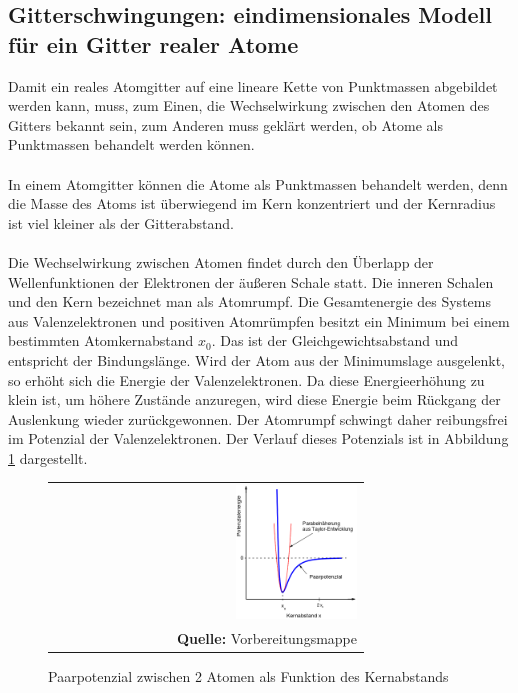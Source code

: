 \documentclass[a4paper,titlepage]{scrartcl}
\numberwithin{equation}{section}
\begin{document}
\subsection{Gitterschwingungen: eindimensionales Modell für ein Gitter realer Atome}
Damit ein reales Atomgitter auf eine lineare Kette von Punktmassen abgebildet werden kann, muss, zum Einen, die Wechselwirkung zwischen den Atomen des Gitters bekannt sein, zum Anderen muss geklärt werden, ob Atome als Punktmassen behandelt werden können.\\ \\
In einem Atomgitter können die Atome als Punktmassen behandelt werden, denn die Masse des Atoms ist überwiegend im Kern konzentriert und der Kernradius ist viel kleiner als der Gitterabstand.\\ \\
Die Wechselwirkung zwischen Atomen findet durch den Überlapp der Wellenfunktionen der Elektronen der äußeren Schale statt. Die inneren Schalen und den Kern bezeichnet man als Atomrumpf. Die Gesamtenergie des Systems aus Valenzelektronen und positiven Atomrümpfen besitzt ein Minimum bei einem bestimmten Atomkernabstand $x_0$. Das ist der Gleichgewichtsabstand und entspricht der Bindungslänge. Wird der Atom aus der Minimumslage ausgelenkt, so erhöht sich die Energie der Valenzelektronen. Da diese Energieerhöhung zu klein ist, um höhere Zustände anzuregen, wird diese Energie beim Rückgang der Auslenkung wieder zurückgewonnen. Der Atomrumpf schwingt daher reibungsfrei im Potenzial der Valenzelektronen. Der Verlauf dieses Potenzials ist in Abbildung \ref{fig:gitterschwingung} dargestellt.
\begin{figure}[H]
	\centering
	\begin{tabular}{@{}r@{}}
		\includegraphics[width=0.4\textwidth]{gitterschwingung.png}\\
		\footnotesize\sffamily\textbf{Quelle:} Vorbereitungsmappe \cite{vorbereitungsmappe}
	\end{tabular}
	\caption{Paarpotenzial zwischen 2 Atomen als Funktion des Kernabstands}
    \label{fig:gitterschwingung}
\end{figure}
\end{document}
